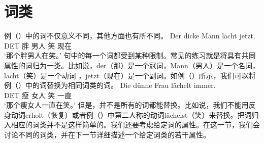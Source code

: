 \section{词类}
\label{Abschnitt-Wortarten}
例（）中的词不仅意义不同，其他方面也有所不同。
\ea
\gll Der dicke Mann lacht jetzt.\\
	 DET 胖 男人 笑 现在\\
\glt `那个胖男人在笑。' 
\z
句中的每一个词都受到某种限制。常见的练习就是将具有共同属性的词归为一类。比如说，der（那）是一个冠词，Mann（男人）是一个名词，lacht（笑）是一个动词 ，jetzt（现在）是一个副词。如例（）所示，我们可以将例（）中的词替换为相同词类的词。
\ea
\gll Die dünne Frau lächelt immer.\\
	 DET 瘦 女人 笑 一直\\
\glt `那个瘦女人一直在笑。' 
\z
但是，并不是所有的词都能替换。比如说，我们不能用反身动词erholt（恢复）或者例（）中第二人称的动词lächelst（笑）来替换。把词归入相应的词类并不是这样简单的。我们还要考虑给定词的属性。在这一节，我们会讨论不同的词类，并在下一节详细描述一个给定词类的若干属性。

